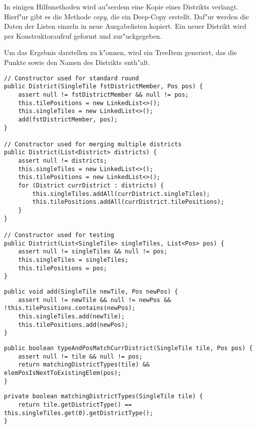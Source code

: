 In einigen Hilfsmethoden wird au"serdem eine Kopie eines Distrikts verlangt. Hierf"ur gibt es die Methode \emph{copy}, die ein Deep-Copy erstellt. Daf"ur werden die Daten der Listen einzeln in neue Ausgabelisten kopiert. Ein neuer Distrikt wird per Konstruktoraufruf geformt und zur"uckgegeben. 

Um das Ergebnis darstellen zu k"onnen, wird ein TreeItem generiert, das die Punkte sowie den Namen des Distrikts enth"alt. 
\begin{lstlisting}[style=CodeHighlighting,float,caption=District - Konstruktoren,label=district_konstruktoren]
// Constructor used for standard round
public District(SingleTile fstDistrictMember, Pos pos) {
    assert null != fstDistrictMember && null != pos;
    this.tilePositions = new LinkedList<>();
    this.singleTiles = new LinkedList<>();
    add(fstDistrictMember, pos);
}

// Constructor used for merging multiple districts
public District(List<District> districts) {
    assert null != districts;
    this.singleTiles = new LinkedList<>();
    this.tilePositions = new LinkedList<>();
    for (District currDistrict : districts) {
        this.singleTiles.addAll(currDistrict.singleTiles);
        this.tilePositions.addAll(currDistrict.tilePositions);
    }
}

// Constructor used for testing 
public District(List<SingleTile> singleTiles, List<Pos> pos) {
    assert null != singleTiles && null != pos;
    this.singleTiles = singleTiles;
    this.tilePositions = pos;
}
\end{lstlisting}
\begin{lstlisting}[style=CodeHighlighting,float,caption=District - add,label=district_add]
public void add(SingleTile newTile, Pos newPos) {
    assert null != newTile && null != newPos && !this.tilePositions.contains(newPos);
    this.singleTiles.add(newTile);
    this.tilePositions.add(newPos);
}
\end{lstlisting}
\begin{lstlisting}[style=CodeHighlighting,float,caption=District - typeAndPosMatchCurrDistrict,label=lst:district_typeAndPosMatchCurrDistrict]
public boolean typeAndPosMatchCurrDistrict(SingleTile tile, Pos pos) {
    assert null != tile && null != pos;
    return matchingDistrictTypes(tile) && elemPosIsNextToExistingElem(pos);
}
\end{lstlisting}
\begin{lstlisting}[style=CodeHighlighting,float,caption=District - matchingDistrictTypes,label=lst:district_matchingDistrictTypes]
private boolean matchingDistrictTypes(SingleTile tile) {
    return tile.getDistrictType() == this.singleTiles.get(0).getDistrictType();
}
\end{lstlisting}
